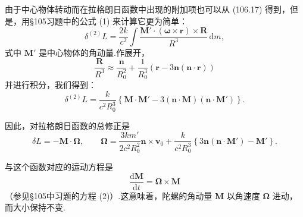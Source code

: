 \begin{xiti}
由于中心物体转动而在拉格朗日函数中出现的附加项也可以从 (106.17) 得到，但是，用§105习题中的公式 (1) 来计算它更为简单：
\begin{equation*}
  \delta^{(2)}L=\frac{2k}{c^{2}}\int
  \frac{\boldsymbol{M}'\cdot(\boldsymbol{\omega}\times\boldsymbol{r})
  \times\boldsymbol{R}}{R^{3}}\,\mathrm{d}m,
\end{equation*}
式中 $\boldsymbol{M}'$ 是中心物体的角动量.作展开，
\begin{equation*}
  \frac{\boldsymbol{R}}{R^{3}}\approx
  \frac{\boldsymbol{n}}{R_0^{2}}
  +\frac{1}{R_0^{3}}
  \left(\boldsymbol{r}-3\boldsymbol{n}(\boldsymbol{n}\cdot\boldsymbol{r})\right)
\end{equation*}
并进行积分，我们得到：
\begin{equation*}
  \delta^{(2)}L=\frac{k}{c^{2}R_0^{3}}
  \left\{\boldsymbol{M}\cdot\boldsymbol{M}'
  -3(\boldsymbol{n}\cdot\boldsymbol{M})(\boldsymbol{n}\cdot\boldsymbol{M}')\right\}.
\end{equation*}

因此，对拉格朗日函数的总修正是
\begin{equation*}
  \delta L=-\boldsymbol{M}\cdot\boldsymbol{\Omega},
  \qquad
  \boldsymbol{\Omega}
  =\frac{3km'}{2c^{2}R_0^{2}}\boldsymbol{n}\times\boldsymbol{v}_0
  +\frac{k}{c^{2}R_0^{3}}
  \left\{3\boldsymbol{n}(\boldsymbol{n}\cdot\boldsymbol{M}')
  -\boldsymbol{M}'\right\}.
\end{equation*}

与这个函数对应的运动方程是
\begin{equation*}
  \frac{\mathrm{d}\boldsymbol{M}}{\mathrm{d}t}
  =\boldsymbol{\Omega}\times\boldsymbol{M}
\end{equation*}
（参见§105中习题的方程 (2)）.这意味着，陀螺的角动量 $\boldsymbol{M}$ 以角速度 $\boldsymbol{\Omega}$ 进动，而大小保持不变.

\end{xiti}
